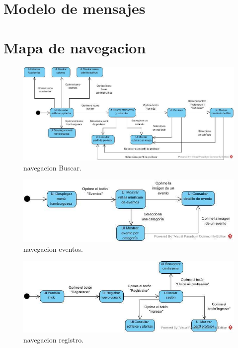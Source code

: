 \documentclass[oneside,10pt]{book}
\begin{document}
\chapter{Modelo de mensajes}


\chapter{Mapa de navegacion}

	\begin{figure}[htbp!]
		\centering
			\includegraphics[width=.5\textwidth]{mapa_nave/imagenesnav/buscar1}
		\caption{navegacion Buscar.}
	\end{figure}
	
	\begin{figure}[htbp!]
		\centering
			\includegraphics[width=.5\textwidth]{mapa_nave/imagenesnav/eventos}
		\caption{navegacion eventos.}
	\end{figure}
	
	\begin{figure}[htbp!]
		\centering
			\includegraphics[width=.5\textwidth]{mapa_nave/imagenesnav/registro}
		\caption{navegacion registro.}
	\end{figure}

\end{document}
